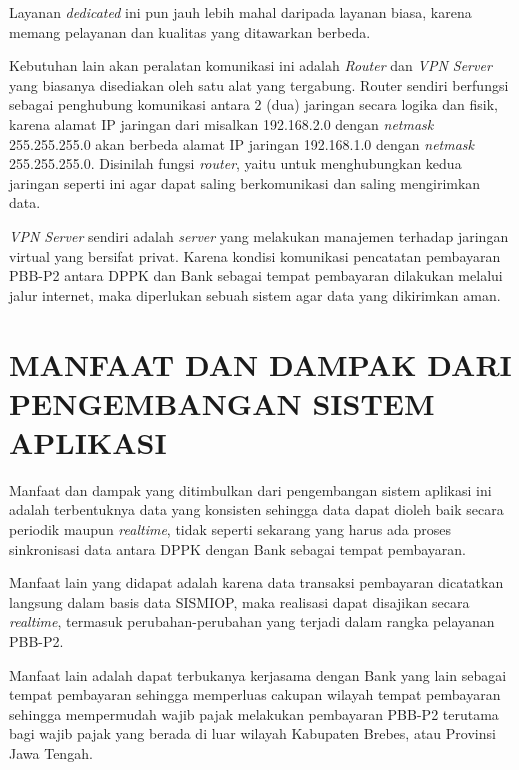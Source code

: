 \documentclass[pdftex,12pt, oneside]{article}
\begin{document}
Layanan \textit{dedicated} ini pun jauh lebih mahal daripada layanan biasa, karena memang pelayanan dan kualitas yang ditawarkan berbeda.

Kebutuhan lain akan peralatan komunikasi ini adalah \textit{Router} dan \textit{VPN Server} yang biasanya disediakan oleh satu alat yang tergabung. Router sendiri berfungsi sebagai penghubung komunikasi antara 2 (dua) jaringan secara logika dan fisik, karena alamat IP jaringan dari misalkan 192.168.2.0 dengan \textit{netmask} 255.255.255.0 akan berbeda alamat IP jaringan 192.168.1.0 dengan \textit{netmask} 255.255.255.0. Disinilah fungsi \textit{router}, yaitu untuk menghubungkan kedua jaringan seperti ini agar dapat saling berkomunikasi dan saling mengirimkan data.

\textit{VPN Server} sendiri adalah \textit{server} yang melakukan manajemen terhadap jaringan virtual yang bersifat privat. Karena kondisi komunikasi pencatatan pembayaran PBB-P2 antara DPPK dan Bank sebagai tempat pembayaran dilakukan melalui jalur internet, maka diperlukan sebuah sistem agar data yang dikirimkan aman. 


\section{MANFAAT DAN DAMPAK DARI PENGEMBANGAN SISTEM APLIKASI}

Manfaat dan dampak yang ditimbulkan dari pengembangan sistem aplikasi ini adalah terbentuknya data yang konsisten sehingga data dapat dioleh baik secara periodik maupun \textit{realtime}, tidak seperti sekarang yang harus ada proses sinkronisasi data antara DPPK dengan Bank sebagai tempat pembayaran.

Manfaat lain yang didapat adalah karena data transaksi pembayaran dicatatkan langsung dalam basis data SISMIOP, maka realisasi dapat disajikan secara \textit{realtime}, termasuk perubahan-perubahan yang terjadi dalam rangka pelayanan PBB-P2.

Manfaat lain adalah dapat terbukanya kerjasama dengan Bank yang lain sebagai tempat pembayaran sehingga memperluas cakupan wilayah tempat pembayaran sehingga mempermudah wajib pajak melakukan pembayaran PBB-P2 terutama bagi wajib pajak yang berada di luar wilayah Kabupaten Brebes, atau Provinsi Jawa Tengah.
\end{document}
